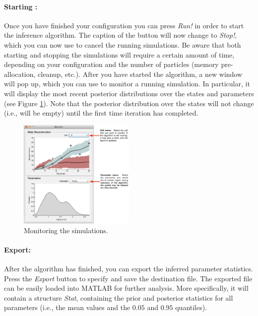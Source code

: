 \documentclass[a4paper, 9pt]{scrartcl}
\begin{document}
\paragraph{Starting \DPP:} Once you have finished your configuration you can press \textit{Run!} in order to start the inference algorithm. The caption of the button will now change to \textit{Stop!}, which you can now use to cancel the running simulations. Be aware that both starting and stopping the simulations will require a certain amount of time, depending on your configuration and the number of particles (memory pre-allocation, cleanup, etc.).
After you have started the algorithm, a new window will pop up, which you can use to monitor a running simulation. In particular, it will display the most recent posterior distributions over the states and parameters (see Figure \ref{fig:Monitor}). Note that the posterior distribution over the states will not change (i.e., will be empty) until the first time iteration has completed.
\begin{figure}[htbp]
\begin{center}
	\includegraphics[width=0.5\textwidth]{figures/Doc_Monitor}
\caption{Monitoring the simulations.}
\label{fig:Monitor}
\end{center}
\end{figure}


\paragraph{Export:} After the algorithm has finished, you can export the inferred parameter statistics. Press the \textit{Export} button to specify and save the destination file. The exported file can be easily loaded into MATLAB for further analysis. More specifically, it will contain a structure \textit{Stat}, containing the prior and posterior statistics for all parameters (i.e., the mean values and the $0.05$ and $0.95$ quantiles).
\end{document}

